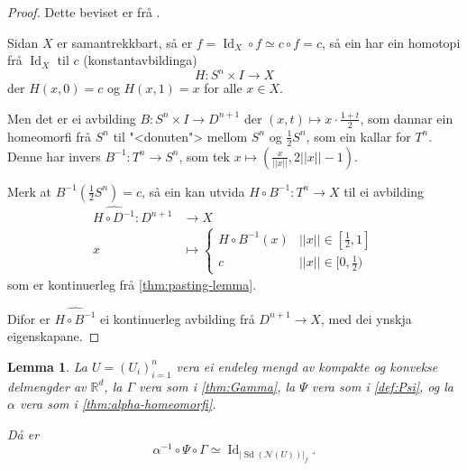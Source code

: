 \documentclass[a4paper, 12pt, norsk]{article}
\theoremstyle{plain}
\newtheorem{lemma}[theorem]{Lemma}
\theoremstyle{definition}
\newcommand{\Rb}{\mathbb{R}}
\newcommand{\Nc}{\mathcal{N}}
\newcommand{\gr}[1]{ \lvert #1 \rvert } %
\newcommand{\tuple}[1]{ \left( #1 \right) } %
\DeclareMathOperator{\Sd}{Sd} %
\DeclareMathOperator{\Id}{Id} %
\begin{document}
\begin{proof}
	Dette beviset er frå \cite[s. 319--320]{MR3932132}.

	Sidan \( X \) er samantrekkbart, så er \( f = \Id_X \circ f \simeq c \circ f = c \), så ein har ein homotopi frå \( \Id_X \) til \( c \) (konstantavbildinga)
	\[
		H: S^n \times I \to X
	\]
	der \( H(x, 0) = c \) og \( H(x, 1) = x \) for alle \( x \in X \).

	Men det er ei avbilding \( B: S^n \times I \to D^{n+1} \) der \( (x,t) \mapsto x\cdot\frac{1+t}{2} \), som dannar ein homeomorfi frå \( S^n \) til "<donuten"> mellom \( S^n \) og \( \frac{1}{2}S^n \), som ein kallar for \( T^n \). Denne har invers \( B^{-1}: T^n \to S^n \), som tek \( x \mapsto \tuple{\frac{x}{||x||}, 2||x||-1} \).
	
	Merk at \( B^{-1}\tuple{\frac{1}{2}S^n}= c \), så ein kan utvida \( H \circ B^{-1}: T^n \to X \) til ei avbilding
	\begin{align*}
		\widehat{H \circ D^{-1}} : D^{n+1} &\to X \\
		x &\mapsto
		\begin{cases}
			H \circ B^{-1}(x) & ||x|| \in [\frac{1}{2}, 1] \\
			c & ||x|| \in [0, \frac{1}{2})
		\end{cases}
	\end{align*}
	som er kontinuerleg frå \autoref{thm:pasting-lemma}.

	Difor er \( \widehat{H \circ B^{-1}} \) ei kontinuerleg avbilding frå \( D^{n+1} \to X \), med dei ynskja eigenskapane.
\end{proof}

\begin{lemma} \label{thm:homeq-sd}
	La \( U = \tuple{U_i}_{i=1}^n \) vera ei endeleg mengd av kompakte og konvekse delmengder av \( \Rb^d \), la \( \Gamma \) vera som i \autoref{thm:Gamma}, la \( \Psi \) vera som i \autoref{def:Psi}, og la \( \alpha \) vera som i \autoref{thm:alpha-homeomorfi}. 
	
	Då er
	\[
		\alpha^{-1} \circ \Psi \circ \Gamma \simeq \Id_{\gr{\Sd(\Nc(U))}_f}.
	\]
\end{lemma}
\end{document}
